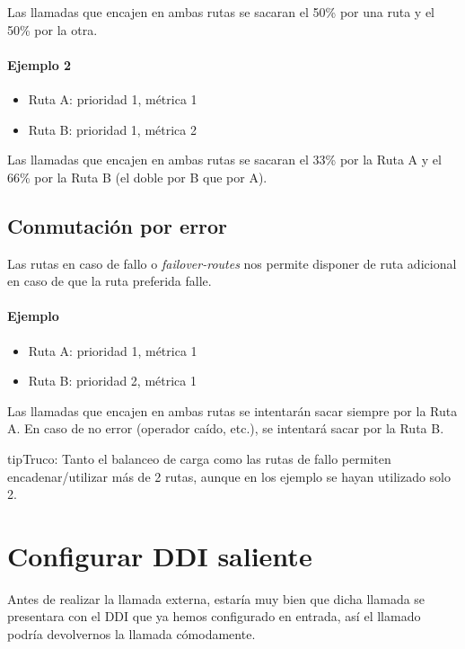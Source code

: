 \documentclass[letterpaper,10pt,spanish]{sphinxmanual}
\begin{document}
Las llamadas que encajen en ambas rutas se sacaran el 50\% por una ruta y el 50\% por la otra.
\paragraph{Ejemplo 2}
\begin{itemize}
\item {} 
Ruta A: prioridad 1, métrica 1

\item {} 
Ruta B: prioridad 1, métrica 2

\end{itemize}

Las llamadas que encajen en ambas rutas se sacaran el 33\% por la Ruta A y el 66\% por la Ruta B (el doble por B que por A).


\subsection{Conmutación por error}
\label{external_outgoing_calls/call_routing:conmutacion-por-error}
Las rutas en caso de fallo o \emph{failover-routes} nos permite disponer de ruta adicional en caso de que la ruta preferida falle.
\paragraph{Ejemplo}
\begin{itemize}
\item {} 
Ruta A: prioridad 1, métrica 1

\item {} 
Ruta B: prioridad 2, métrica 1

\end{itemize}

Las llamadas que encajen en ambas rutas se intentarán sacar siempre por la Ruta A. En caso de no error (operador caído, etc.), se intentará sacar por la Ruta B.

\begin{notice}{tip}{Truco:}
Tanto el balanceo de carga como las rutas de fallo permiten encadenar/utilizar más de 2 rutas, aunque en los ejemplo se hayan utilizado solo 2.
\end{notice}


\section{Configurar DDI saliente}
\label{external_outgoing_calls/external_ddi:external-ddi}\label{external_outgoing_calls/external_ddi::doc}\label{external_outgoing_calls/external_ddi:configurar-ddi-saliente}
Antes de realizar la llamada externa, estaría muy bien que dicha llamada se presentara con el DDI que ya hemos configurado en entrada, así el llamado podría devolvernos la llamada cómodamente.
\end{document}
